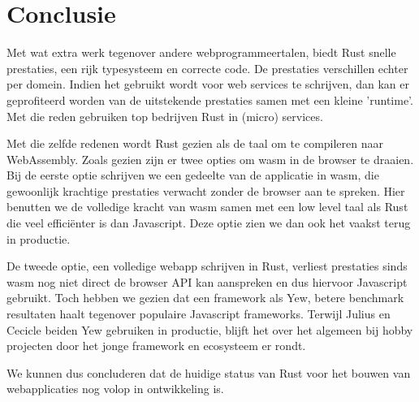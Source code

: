 \chapter{Conclusie}

Met wat extra werk tegenover andere webprogrammeertalen, biedt Rust snelle prestaties, een rijk
typesysteem en correcte code. De prestaties verschillen echter per domein. Indien het gebruikt wordt
voor web services te schrijven, dan kan er geprofiteerd worden van de uitstekende prestaties samen
met een kleine 'runtime'. Met die reden gebruiken top bedrijven Rust in (micro) services.

Met die zelfde redenen wordt Rust gezien als de taal om te compileren naar WebAssembly. Zoals gezien
zijn er twee opties om wasm in de browser te draaien. Bij de eerste optie schrijven we een gedeelte
van de applicatie in wasm, die gewoonlijk krachtige prestaties verwacht zonder de browser aan te
spreken. Hier benutten we de volledige kracht van wasm samen met een low level taal als Rust
die veel efficiënter is dan Javascript. Deze optie zien we dan ook het vaakst terug in productie.

De tweede optie, een volledige webapp schrijven in Rust, verliest prestaties sinds wasm nog niet
direct de browser API kan aanspreken en dus hiervoor Javascript gebruikt. Toch hebben we gezien dat
een framework als Yew, betere benchmark resultaten haalt tegenover populaire Javascript frameworks.
Terwijl Julius en Cecicle beiden Yew gebruiken in productie, blijft het over het algemeen bij hobby
projecten door het jonge framework en ecosysteem er rondt.

We kunnen dus concluderen dat de huidige status van Rust voor het bouwen van webapplicaties nog
volop in ontwikkeling is.
